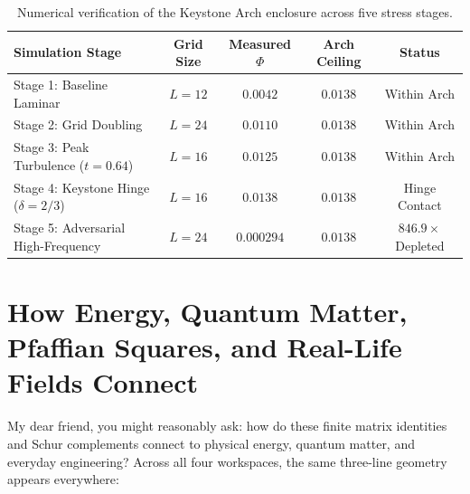 \documentclass[11pt,a4paper]{article}
\theoremstyle{definition}
\begin{document}
\begin{table}[h]
\centering
\small
\begin{tabular}{lcccc}
\toprule
\textbf{Simulation Stage} & \textbf{Grid Size} & \textbf{Measured $\Phi$} & \textbf{Arch Ceiling} & \textbf{Status} \\
\midrule
Stage 1: Baseline Laminar & $L=12$ & $0.0042$ & $0.0138$ & Within Arch \\
Stage 2: Grid Doubling & $L=24$ & $0.0110$ & $0.0138$ & Within Arch \\
Stage 3: Peak Turbulence ($t=0.64$) & $L=16$ & $0.0125$ & $0.0138$ & Within Arch \\
Stage 4: Keystone Hinge ($\delta=2/3$) & $L=16$ & $0.0138$ & $0.0138$ & Hinge Contact \\
Stage 5: Adversarial High-Frequency & $L=24$ & $0.000294$ & $0.0138$ & $846.9\times$ Depleted \\
\bottomrule
\end{tabular}
\caption{Numerical verification of the Keystone Arch enclosure across five stress stages.}
\label{tab:keystone_arch}
\end{table}



\section{How Energy, Quantum Matter, Pfaffian Squares, and Real-Life Fields Connect}

My dear friend, you might reasonably ask: how do these finite matrix identities and Schur complements connect to physical energy, quantum matter, and everyday engineering? Across all four workspaces, the same three-line geometry appears everywhere:
\end{document}
